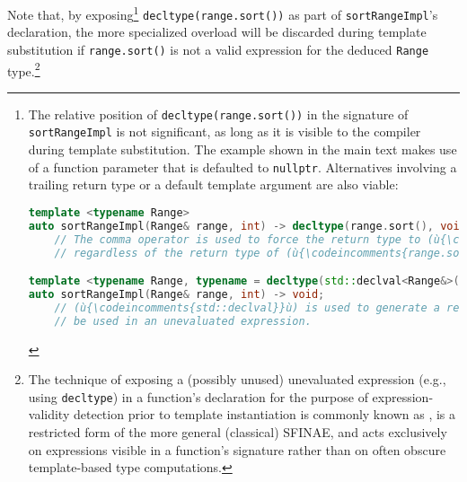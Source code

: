 \noindent Note that, by exposing{\cprotect\footnote{The relative position of
\lstinline!decltype(range.sort())! in the signature of
\lstinline!sortRangeImpl! is not significant, as long as it is visible to
the compiler 
during template substitution. The example shown in the main text makes use of a function parameter that is defaulted to
\lstinline!nullptr!. Alternatives involving a trailing return type or a
default template argument are also viable:

%
\begin{lstlisting}[language=C++, basicstyle={\ttfamily\footnotesize}]
template <typename Range>
auto sortRangeImpl(Range& range, int) -> decltype(range.sort(), void());
    // The comma operator is used to force the return type to (ù{\codeincomments{void}}ù),
    // regardless of the return type of (ù{\codeincomments{range.sort()}}ù).

template <typename Range, typename = decltype(std::declval<Range&>().sort())>   
auto sortRangeImpl(Range& range, int) -> void;
    // (ù{\codeincomments{std::declval}}ù) is used to generate a reference to (ù{\codeincomments{Range}}ù) that can
    // be used in an unevaluated expression.
\end{lstlisting}
      }} \lstinline!decltype(range.sort())! as part of
\lstinline!sortRangeImpl!'s declaration, the more specialized overload will
be discarded during template substitution if \lstinline!range.sort()! is
not a valid expression for the deduced \lstinline!Range!
type.{\cprotect\footnote{The technique of exposing a (possibly unused)
unevaluated expression (e.g., using \lstinline!decltype!) in a function's
declaration for the purpose of expression-validity detection prior to
template instantiation is commonly known as ,
is a restricted form of the more general (classical) SFINAE, and acts exclusively on
expressions visible in a function's signature rather than on often obscure
  template-based type computations.}}

